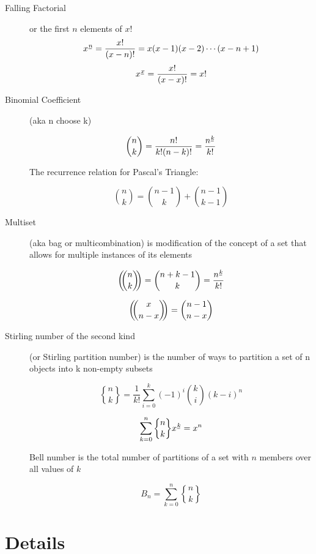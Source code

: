 \documentclass[]{article}
\newcommand{\fallingfactorial}[1]{%
  ^{\mspace{1mu}\underline{#1\mspace{-2mu}}\mspace{2mu}}%
}
\newcommand{\stirlingii}{\genfrac{\{}{\}}{0pt}{}}
\newcommand{\multichoose}[2]{\bigg(\!\!\dbinom{#1}{#2}\!\!\bigg)}
\begin{document}
\begin{description}

\item [Falling Factorial] or the first $n$ elements of $x!$ \\

$$x\fallingfactorial{n} = \frac{x!}{(x-n)!} = x(x-1)(x-2)\cdots(x-n+1)$$
$$x\fallingfactorial{x} = \frac{x!}{(x-x)!} = x!$$

\item [Binomial Coefficient] (aka n choose k)

$$\binom{n}{k} =  \frac{n!}{k!(n-k)!} = \frac{n\fallingfactorial{k}}{k!}$$

The recurrence relation for Pascal's Triangle:

$$\binom{n}{k} = \binom{n-1}{k} + \binom{n-1}{k-1}$$

\item [Multiset] (aka bag or multicombination) is modification of the concept of a set that allows for multiple instances of its elements

$$\multichoose{n}{k} = \binom{n+k-1}{k} = \frac{n\fallingfactorial{k}}{k!}$$

$$\multichoose{x}{n-x} = \binom{n-1}{n-x}$$

\item [Stirling number of the second kind] (or Stirling partition number) is the number of ways to partition a set of n objects into k non-empty subsets

$$\stirlingii{n}{k} = \frac{1}{k!}\sum_{i=0}^{k}{(-1)^i \binom{k}{i} (k-i)^n}$$

$$\sum_{k=0}^{n}{\stirlingii{n}{k} x\fallingfactorial{k}} = x^n$$

Bell number is the total number of partitions of a set with $n$ members over all values of $k$

$$B_n = \sum_{k=0}^{n} \stirlingii{n}{k}$$

\end{description}

\section*{Details}
\end{document}
